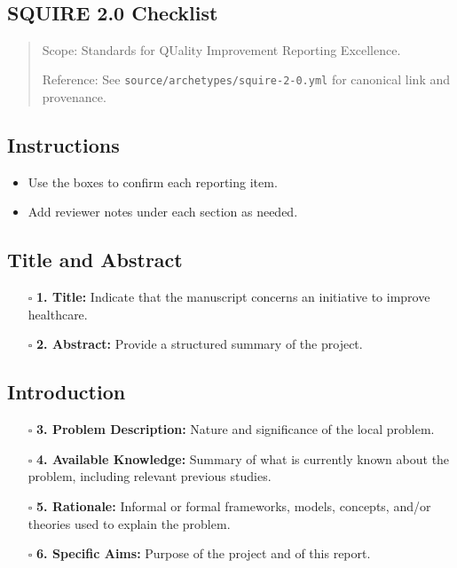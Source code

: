 \documentclass[11pt]{article}
\def\tightlist{}
\begin{document}
\begin{center}
{\LARGE }\\[4pt]
\normalsize 
\end{center}
\vspace{1em}

\begin{Form}

\section{SQUIRE 2.0 Checklist}\label{squire-2.0-checklist}

\begin{quote}
Scope: Standards for QUality Improvement Reporting Excellence.

Reference: See \texttt{source/archetypes/squire-2-0.yml} for canonical
link and provenance.
\end{quote}

\subsection{Instructions}\label{instructions}

\begin{itemize}
\tightlist
\item
  Use the boxes to confirm each reporting item.
\item
  Add reviewer notes under each section as needed.
\end{itemize}

\subsection{Title and Abstract}\label{title-and-abstract}

\begin{itemize}
\tightlist
\item[$\square$]
  \textbf{1. Title:} Indicate that the manuscript concerns an initiative
  to improve healthcare.
\item[$\square$]
  \textbf{2. Abstract:} Provide a structured summary of the project.
\end{itemize}

\subsection{Introduction}\label{introduction}

\begin{itemize}
\tightlist
\item[$\square$]
  \textbf{3. Problem Description:} Nature and significance of the local
  problem.
\item[$\square$]
  \textbf{4. Available Knowledge:} Summary of what is currently known
  about the problem, including relevant previous studies.
\item[$\square$]
  \textbf{5. Rationale:} Informal or formal frameworks, models,
  concepts, and/or theories used to explain the problem.
\item[$\square$]
  \textbf{6. Specific Aims:} Purpose of the project and of this report.
\end{itemize}


\end{Form}
\end{document}
